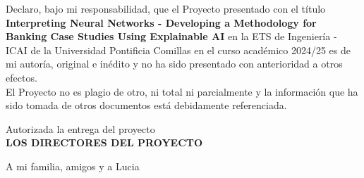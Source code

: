 \documentclass[12pt]{extarticle}
\numberwithin{equation}{section}
\begin{document}
\newpage

{\fontsize{14}{18}\selectfont
    Declaro, bajo mi responsabilidad, que el Proyecto presentado con el título \textbf{Interpreting Neural Networks - Developing a Methodology for Banking Case Studies Using Explainable AI} en la ETS de Ingeniería - ICAI de la Universidad Pontificia Comillas en el curso académico 2024/25 es de mi autoría, original e inédito y no ha sido presentado con anterioridad a otros efectos. \\
    
    El Proyecto no es plagio de otro, ni total ni parcialmente y la información que ha sido tomada de otros documentos está debidamente referenciada.
    
    \vspace{2cm}
    

    
    \vspace{2cm}
    
    \begin{center}
        Autorizada la entrega del proyecto \\
        \vspace{1cm}
        \textbf{LOS DIRECTORES DEL PROYECTO}
    \end{center}
    
    \vspace{1cm}
    
}

\newpage

{\fontsize{17}{20}
    \begin{center}
        {\large A mi familia, amigos y a Lucia}
    \end{center}
}

\newpage
\begin{abstract}
    Neural networks are increasingly employed in the banking sector for tasks ranging from credit scoring to fraud detection. Despite their powerful predictive capabilities, the opacity of neural network models poses significant challenges for their interpretability. This project aims to bridge the gap between neural network architectures and their practical interpretation by developing a comprehensive methodology utilizing state-of-the-art Explainable AI (XAI) techniques.
\end{abstract}
\end{document}
